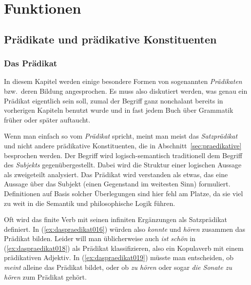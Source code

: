 \chapter{Funktionen}
\label{sec:funktionen}

\section{Prädikate und prädikative Konstituenten}
\label{sec:praedikateundpraedikativekonstituenten}

\subsection{Das Prädikat}
\label{sec:daspraedikat}


In diesem Kapitel werden einige besondere Formen von sogenannten \textit{Prädikaten} bzw.\ deren Bildung angesprochen.
Es muss also diskutiert werden, was genau ein Prädikat eigentlich sein soll, zumal der Begriff ganz nonchalant bereits in vorherigen Kapiteln benutzt wurde und in fast jedem Buch über Grammatik früher oder später auftaucht.


Wenn man einfach so vom \textit{Prädikat} spricht, meint man meist das \textit{Satzprädikat} und nicht andere prädikative Konstituenten, die in Abschnitt~\ref{sec:praedikative} besprochen werden.
Der Begriff wird logisch-semantisch traditionell dem Begriff des \textit{Subjekts} gegenübergestellt.
Dabei wird die Struktur einer logischen Aussage als zweigeteilt analysiert.
Das Prädikat wird verstanden als etwas, das eine Aussage über das Subjekt (einen Gegenstand im weitesten Sinn) formuliert.
Definitionen auf Basis solcher Überlegungen sind hier fehl am Platze, da sie viel zu weit in die Semantik und philosophische Logik führen.

Oft wird das finite Verb mit seinen infiniten Ergänzungen als Satzprädikat definiert.
In (\ref{ex:daspraedikat016}) würden also \textit{konnte} und \textit{hören} zusammen das Prädikat bilden.
Leider will man üblicherweise auch \textit{ist schön} in (\ref{ex:daspraedikat018}) als Prädikat klassifizieren, also ein Kopulaverb mit einem prädikativen Adjektiv.
In (\ref{ex:daspraedikat019}) müsste man entscheiden, ob \textit{meint} alleine das Prädikat bildet, oder ob \textit{zu hören} oder sogar \textit{die Sonate zu hören} zum Prädikat gehört.

\begin{exe}
  \ex\label{ex:daspraedikat016}
  \begin{xlist}
  \end{xlist}
\end{exe}

